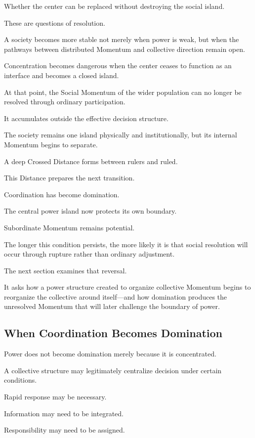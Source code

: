 Whether the center can be replaced without destroying the social island.

These are questions of resolution.

A society becomes more stable not merely when power is weak, but when the pathways between distributed Momentum and collective direction remain open.

Concentration becomes dangerous when the center ceases to function as an interface and becomes a closed island.

At that point, the Social Momentum of the wider population can no longer be resolved through ordinary participation.

It accumulates outside the effective decision structure.

The society remains one island physically and institutionally, but its internal Momentum begins to separate.

A deep Crossed Distance forms between rulers and ruled.

This Distance prepares the next transition.

Coordination has become domination.

The central power island now protects its own boundary.

Subordinate Momentum remains potential.

The longer this condition persists, the more likely it is that social resolution will occur through rupture rather than ordinary adjustment.

The next section examines that reversal.

It asks how a power structure created to organize collective Momentum begins to reorganize the collective around itself—and how domination produces the unresolved Momentum that will later challenge the boundary of power.

\subsection*{\textbf{When Coordination Becomes Domination}}


Power does not become domination merely because it is concentrated.

A collective structure may legitimately centralize decision under certain conditions.

Rapid response may be necessary.

Information may need to be integrated.

Responsibility may need to be assigned.

